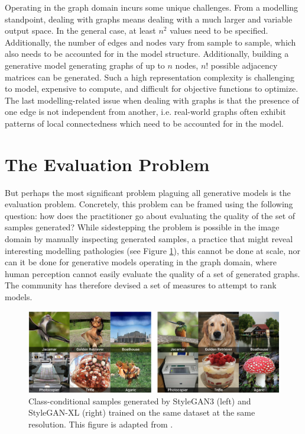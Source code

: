 Operating in the graph domain incurs some unique challenges. From a modelling
standpoint, dealing with graphs means dealing with a much larger and variable
output space. In the general case, at least $n^2$ values need to be specified.
Additionally, the number of edges and nodes vary from sample to sample, which
also needs to be accounted for in the model structure. Additionally, building a
generative model generating graphs of up to $n$ nodes, $n!$ possible adjacency
matrices can be generated. Such a high representation complexity is challenging
to model, expensive to compute, and difficult for objective functions to
optimize. The last modelling-related issue when dealing with graphs is that the
presence of one edge is not independent from another, i.e. real-world graphs
often exhibit patterns of local connectedness which need to be accounted for in
the model.

\section{The Evaluation Problem}

But perhaps the most significant problem plaguing all generative models is the
evaluation problem. Concretely, this problem can be framed using the following
question: how does the practitioner go about evaluating the quality of the set
of samples generated? While sidestepping the problem is possible in the image
domain by manually inspecting generated samples, a practice that might reveal
interesting modelling pathologies (see Figure \ref{fig:ganpathologies}), this
cannot be done at scale, nor can it be done for generative models operating in
the graph domain, where human perception cannot easily evaluate the quality of a
set of generated graphs. The community has therefore devised a set of measures
to attempt to rank models.

\begin{figure}
  \centering
  \includegraphics[width=\textwidth]{figures/pathologies.png}
  \caption{Class-conditional samples generated by StyleGAN3 (left) and
    StyleGAN-XL (right) trained on the same dataset at the same resolution. This
    figure is adapted from \citet{sauer2022stylegan}.}
  \label{fig:ganpathologies}
\end{figure}

